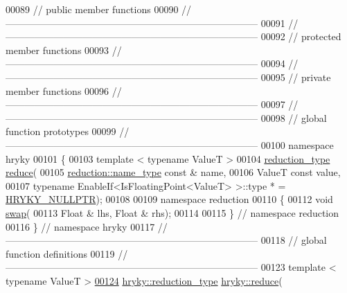 \begin{DoxyCode}
00089 \textcolor{comment}{// public member functions}
00090 \textcolor{comment}{//
      ------------------------------------------------------------------------------}
00091 \textcolor{comment}{//
      ------------------------------------------------------------------------------}
00092 \textcolor{comment}{// protected member functions}
00093 \textcolor{comment}{//
      ------------------------------------------------------------------------------}
00094 \textcolor{comment}{//
      ------------------------------------------------------------------------------}
00095 \textcolor{comment}{// private member functions}
00096 \textcolor{comment}{//
      ------------------------------------------------------------------------------}
00097 \textcolor{comment}{//
      ------------------------------------------------------------------------------}
00098 \textcolor{comment}{// global function prototypes}
00099 \textcolor{comment}{//
      ------------------------------------------------------------------------------}
00100 \textcolor{keyword}{namespace }hryky
00101 \{
00103     \textcolor{keyword}{template} < \textcolor{keyword}{typename} ValueT >
00104     \hyperlink{namespacehryky_a343a9a4c36a586be5c2693156200eadc}{reduction_type} \hyperlink{namespacehryky_af41cb3af6766761da0ff21b84527a52c}{reduce}(
00105         \hyperlink{namespacehryky_1_1reduction_ac686c30a4c8d196bbd0f05629a6b921f}{reduction::name_type} \textcolor{keyword}{const} & name,
00106         ValueT \textcolor{keyword}{const} value,
00107         \textcolor{keyword}{typename} EnableIf<IsFloatingPoint<ValueT> >::type * = \hyperlink{common_8h_a4cd4ac09cfcdbd6b30ee69afc156e210}{HRYKY_NULLPTR});
00108 
00109 \textcolor{keyword}{namespace }reduction
00110 \{
00112     \textcolor{keywordtype}{void} \hyperlink{namespacehryky_1_1reduction_a493c83efdf5f9e9c49ba77e1b65325a1}{swap}(
00113         Float & lhs, Float & rhs);
00114 
00115 \} \textcolor{comment}{// namespace reduction}
00116 \} \textcolor{comment}{// namespace hryky}
00117 \textcolor{comment}{//
      ------------------------------------------------------------------------------}
00118 \textcolor{comment}{// global function definitions}
00119 \textcolor{comment}{//
      ------------------------------------------------------------------------------}
00123 \textcolor{comment}{}\textcolor{keyword}{template} < \textcolor{keyword}{typename} ValueT >
\hypertarget{reduction__float_8h_source_l00124}{}\hyperlink{namespacehryky_ada502f50939bc4ff0a7d1608c8478c7a}{00124} \hyperlink{classhryky_1_1_intrusive_ptr}{hryky::reduction_type} \hyperlink{namespacehryky_af41cb3af6766761da0ff21b84527a52c}{hryky::reduce}(

\end{DoxyCode}
